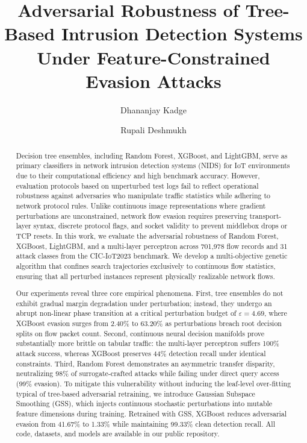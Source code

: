 \documentclass[final,5p,times,twocolumn]{elsarticle}
\begin{document}
\begin{frontmatter}

\title{Adversarial Robustness of Tree-Based Intrusion Detection Systems Under Feature-Constrained Evasion Attacks}

\author[a]{Dhananjay Kadge}

\author[a]{Rupali Deshmukh}

\address[a]{Department of Computer Science and Engineering, School of Engineering and Technology, MGM University, Chhatrapati Sambhajinagar 431003, Maharashtra, India}

\begin{abstract}
Decision tree ensembles, including Random Forest, XGBoost, and LightGBM, serve as primary classifiers in network intrusion detection systems (NIDS) for IoT environments due to their computational efficiency and high benchmark accuracy. However, evaluation protocols based on unperturbed test logs fail to reflect operational robustness against adversaries who manipulate traffic statistics while adhering to network protocol rules. Unlike continuous image representations where gradient perturbations are unconstrained, network flow evasion requires preserving transport-layer syntax, discrete protocol flags, and socket validity to prevent middlebox drops or TCP resets. In this work, we evaluate the adversarial robustness of Random Forest, XGBoost, LightGBM, and a multi-layer perceptron across 701,978 flow records and 31 attack classes from the CIC-IoT2023 benchmark. We develop a multi-objective genetic algorithm that confines search trajectories exclusively to continuous flow statistics, ensuring that all perturbed instances represent physically realizable network flows.

Our experiments reveal three core empirical phenomena. First, tree ensembles do not exhibit gradual margin degradation under perturbation; instead, they undergo an abrupt non-linear phase transition at a critical perturbation budget of $\varepsilon = 4.69$, where XGBoost evasion surges from 2.40\% to 63.20\% as perturbations breach root decision splits on flow packet count. Second, continuous neural decision manifolds prove substantially more brittle on tabular traffic: the multi-layer perceptron suffers 100\% attack success, whereas XGBoost preserves 44\% detection recall under identical constraints. Third, Random Forest demonstrates an asymmetric transfer disparity, neutralizing 98\% of surrogate-crafted attacks while failing under direct query access (99\% evasion). To mitigate this vulnerability without inducing the leaf-level over-fitting typical of tree-based adversarial retraining, we introduce Gaussian Subspace Smoothing (GSS), which injects continuous stochastic perturbations into mutable feature dimensions during training. Retrained with GSS, XGBoost reduces adversarial evasion from 41.67\% to 1.33\% while maintaining 99.33\% clean detection recall. All code, datasets, and models are available in our public repository.
\end{abstract}


\end{frontmatter}
\end{document}
